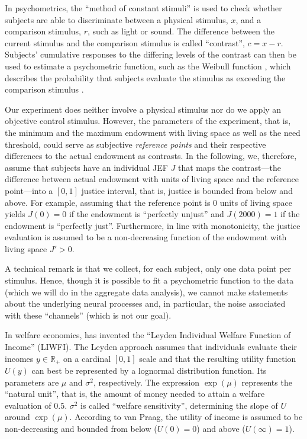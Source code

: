 \documentclass[12pt]{scrartcl}
\begin{document}
In psychometrics, the ``method of constant stimuli'' is used to check whether subjects are able to discriminate between a physical stimulus, $x$, and a comparison stimulus, $r$, such as light or sound.
The difference between the current stimulus and the comparison stimulus is called ``contrast'', $c=x-r$.
Subjects' cumulative responses to the differing levels of the contrast can then be used to estimate a psychometric function, such as the Weibull function \citep{wichmann_psychometric_2001,mortensen_additive_2002}, which describes the probability that subjects evaluate the stimulus as exceeding the comparison stimulus \citep[p.~2503]{treutwein_adaptive_1995}.

Our experiment does neither involve a physical stimulus nor do we apply an objective control stimulus.
However, the parameters of the experiment, that is, the minimum and the maximum endowment with living space as well as the need threshold, could serve as subjective \textit{reference points} and their respective differences to the actual endowment as contrasts.
In the following, we, therefore, assume that subjects have an individual JEF $J$ that maps the contrast---the difference between actual endowment with units of living space and the reference point---into a $[0,1]$ justice interval, that is, justice is bounded from below and above.
For example, assuming that the reference point is $0$ units of living space yields $J(0)=0$ if the endowment is ``perfectly unjust'' and $J(2000)=1$ if the endowment is ``perfectly just''.
Furthermore, in line with monotonicity, the justice evaluation is assumed to be a non-decreasing function of the endowment with living space $J'>0$.

A technical remark is that we collect, for each subject, only one data point per stimulus.
Hence, though it is possible to fit a psychometric function to the data (which we will do in the aggregate data analysis), we cannot make statements about the underlying neural processes and, in particular, the noise associated with these ``channels'' (which is not our goal).

In welfare economics, \citet{van_praag_individual_1968,van_praag_welfare_1971} has invented the ``Leyden Individual Welfare Function of Income'' (LIWFI).
The Leyden approach assumes that individuals evaluate their incomes $y\in\mathds{R}_+$ on a cardinal $[0,1]$ scale and that the resulting utility function $U(y)$ can best be represented by a lognormal distribution function.
Its parameters are $\mu$ and $\sigma^2$, respectively.
The expression $\exp(\mu)$ represents the ``natural unit'', that is, the amount of money needed to attain a welfare evaluation of $0.5$.
$\sigma^2$ is called ``welfare sensitivity'', determining the slope of $U$ around $\exp(\mu)$.
According to van Praag, the utility of income is assumed to be non-decreasing and bounded from below ($U(0)=0$) and above ($U(\infty)=1$).
\end{document}
